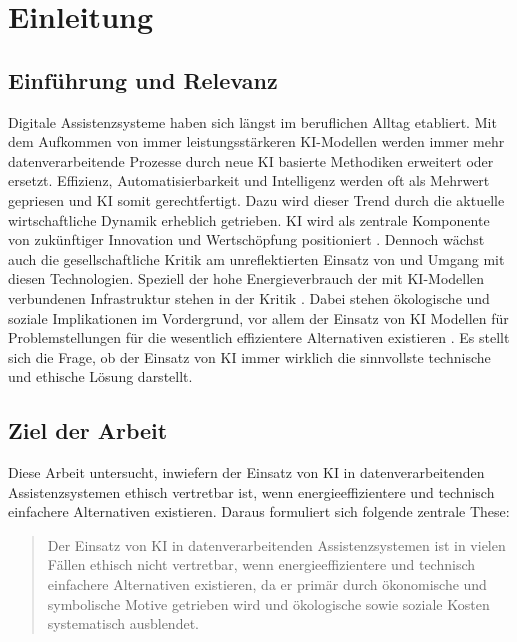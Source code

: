 \chapter{Einleitung}
\label{chap:einleitung}

\section{Einführung und Relevanz}
Digitale Assistenzsysteme haben sich längst im beruflichen Alltag etabliert. Mit dem Aufkommen von immer leistungsstärkeren KI-Modellen werden immer mehr datenverarbeitende Prozesse durch neue KI basierte Methodiken erweitert oder ersetzt. Effizienz, Automatisierbarkeit und Intelligenz werden oft als Mehrwert gepriesen und KI somit gerechtfertigt. Dazu wird dieser Trend durch die aktuelle wirtschaftliche Dynamik erheblich getrieben. KI wird als zentrale Komponente von zukünftiger Innovation und Wertschöpfung positioniert \cite{GlobalAIAdoption2025}. Dennoch wächst auch die gesellschaftliche Kritik am unreflektierten Einsatz von und Umgang mit diesen Technologien. Speziell der hohe Energieverbrauch der mit KI-Modellen verbundenen Infrastruktur stehen in der Kritik \cite{jiSystematicReviewElectricity2026a,EnergyAI2025}. Dabei stehen ökologische und soziale Implikationen im Vordergrund, vor allem der Einsatz von KI Modellen für Problemstellungen für die wesentlich effizientere Alternativen existieren \cite{akohatadogaToolsTechniquesTrends2024,ventersSustainableSoftwareEngineering2023}. Es stellt sich die Frage, ob der Einsatz von KI immer wirklich die sinnvollste technische und ethische Lösung darstellt. 

\section{Ziel der Arbeit}
Diese Arbeit untersucht, inwiefern der Einsatz von KI in datenverarbeitenden Assistenzsystemen ethisch vertretbar ist, wenn energieeffizientere und technisch einfachere Alternativen existieren. Daraus formuliert sich folgende zentrale These:

\begin{quote}
    Der Einsatz von KI in datenverarbeitenden Assistenzsystemen ist in vielen Fällen ethisch nicht vertretbar, wenn energieeffizientere und technisch einfachere Alternativen existieren, da er primär durch ökonomische und symbolische Motive getrieben wird und ökologische sowie soziale Kosten systematisch ausblendet.
\end{quote}

